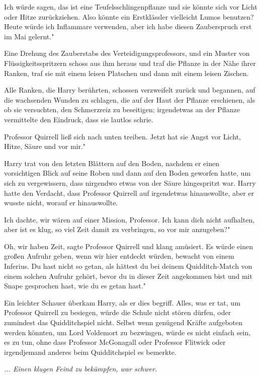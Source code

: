 \glqq Ich würde sagen, das ist eine Teufelsschlingenpflanze und sie könnte sich
vor Licht oder Hitze zurückziehen. Also könnte ein Erstklässler vielleicht Lumos
benutzen? Heute würde ich Inflammare verwenden, aber ich habe diesen
Zauberspruch erst im Mai gelernt."

Eine Drehung des Zauberstabs des Verteidigungsprofessors, und ein Muster von
Flüssigkeitsspritzern schoss aus ihm heraus und traf die Pflanze in der Nähe
ihrer Ranken, traf sie mit einem leisen Platschen und dann mit einem leisen
Zischen.

Alle Ranken, die Harry berührten, schossen verzweifelt zurück und begannen, auf
die wachsenden Wunden zu schlagen, die auf der Haut der Pflanze erschienen, als
ob sie versuchten, den Schmerzreiz zu beseitigen; irgendetwas an der Pflanze
vermittelte den Eindruck, dass sie lautlos schrie.

Professor Quirrell ließ sich nach unten treiben. \glqq Jetzt hat sie Angst vor
Licht, Hitze, Säure und vor mir."

Harry trat von den letzten Blättern auf den Boden, nachdem er einen vorsichtigen
Blick auf seine Roben und dann auf den Boden geworfen hatte, um sich zu
vergewissern, dass nirgendwo etwas von der Säure hingespritzt war. Harry hatte
den Verdacht, dass Professor Quirrell auf irgendetwas hinauswollte, aber er
wusste nicht, worauf er hinauswollte.

\glqq Ich dachte, wir wären auf einer Mission, Professor. Ich kann dich nicht
aufhalten, aber ist es klug, so viel Zeit damit zu verbringen, so vor mir
anzugeben?"

\glqq Oh, wir haben Zeit\grqq{}, sagte Professor Quirrell und klang amüsiert.
\glqq Es würde einen großen Aufruhr geben, wenn wir hier entdeckt würden,
bewacht von einem Inferius. Du hast nicht so getan, als hättest du bei deinem
Quidditch-Match von einem solchen Aufruhr gehört, bevor du in dieser Zeit
angekommen bist und mit Snape gesprochen hast, wie du es getan hast."

Ein leichter Schauer überkam Harry, als er dies begriff. Alles, was er tat, um
Professor Quirrell zu besiegen, würde die Schule nicht stören dürfen, oder
zumindest das Quidditchspiel nicht. Selbst wenn genügend Kräfte aufgeboten
werden könnten, um Lord Voldemort zu bezwingen, würde es nicht einfach sein, es
zu tun, ohne dass Professor McGonagall oder Professor Flitwick oder irgendjemand
anderes beim Quidditchspiel es bemerkte.

\emph{... Einen klugen Feind zu bekämpfen, war schwer.}

